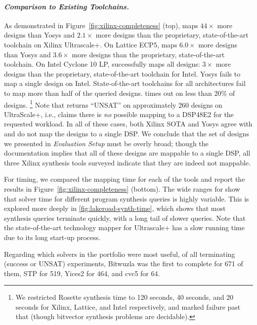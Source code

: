 \paragraph{\textnormal{\textit{\textbf{Comparison to Existing Toolchains.}}}}
As demonstrated in Figure~\ref{fig:xilinx-completeness} (top),
  \lr maps $44\times$ more
  designs than Yosys
  and $2.1\times$ more designs
  than the proprietary,
  state-of-the-art toolchain on Xilinx Ultrascale+.
On Lattice ECP5,
  \lr maps $6.0\times$ more
  designs than Yosys 
  and $3.6\times$ more designs
  than the proprietary,
  state-of-the-art toolchain.
On Intel Cyclone 10 LP,
  \lr successfully maps all designs:
  $3\times$ more designs
  than the proprietary,
  state-of-the-art toolchain for Intel.
Yosys fails to map a single design
  on Intel.
State-of-the-art toolchains
  for all architectures fail
  to map more than half
  of the queried designs.
\lr times out on 
less than 20\% of designs.%
\footnote{We restricted Rosette
synthesis time to 
120 seconds, 40 seconds, and 20 seconds for
Xilinx, Lattice, and Intel
respectively, and
marked failure past that (though bitvector synthesis problems
are decidable).}
Note that \lr
  returns ``UNSAT'' on 
  approximately 260
  designs on UltraScale+, i.e., 
  \lr claims there is
  \textit{no} possible mapping
  to a DSP48E2 for the
  requested workload.
In all of these cases,
  both Xilinx SOTA
  and Yosys
  agree with \lr 
  and do not map the designs
  to a single DSP.
We conclude that 
  the set of designs we presented in 
  \textit{Evaluation Setup}
  must be overly broad;
  though the documentation implies
  that all of these designs are mappable
  to a single DSP,
  all three Xilinx synthesis tools 
  surveyed indicate that they are
  indeed not mappable.

For timing, we compared the mapping time for each
  of the tools
  and report the results
  in Figure~\ref{fig:xilinx-completeness} (bottom).
The wide ranges for \lr
  show that solver time for different
  program synthesis queries
  is highly variable.
This is explored more deeply in
  \cref{fig:lakeroad-synth-time},
  which shows that most synthesis queries
  terminate quickly,
  with a long tail of slower queries.
Note that the state-of-the-art technology
mapper for Ultrascale+ has a slow running time
  due to its long start-up process.\tighten

Regarding which solvers
  in the portfolio were
  most useful,
  of all terminating
  (success or UNSAT)
  \lr experiments,
  Bitwuzla was the first
  to complete
  for 671 of them,
  STP for 519,
  Yices2 for 464,
  and cvc5 for 64.

